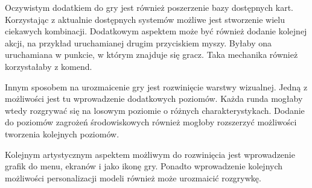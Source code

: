 Oczywistym dodatkiem do gry jest również poszerzenie bazy dostępnych kart. Korzystając z aktualnie dostępnych systemów możliwe jest stworzenie wielu ciekawych kombinacji. Dodatkowym aspektem może być również dodanie kolejnej akcji, na przykład uruchamianej drugim przyciskiem myszy. Byłaby ona uruchamiana w punkcie, w którym znajduje się gracz. Taka mechanika również korzystałaby z komend.

Innym sposobem na urozmaicenie gry jest rozwinięcie warstwy wizualnej. Jedną z możliwości jest tu wprowadzenie dodatkowych poziomów. Każda runda mogłaby wtedy rozgrywać się na losowym poziomie o różnych charakterystykach. Dodanie do poziomów zagrożeń środowiskowych również mogłoby rozszerzyć możliwości tworzenia kolejnych poziomów.

Kolejnym artystycznym aspektem możliwym do rozwinięcia jest wprowadzenie grafik do menu, ekranów i jako ikonę gry. Ponadto wprowadzenie kolejnych możliwości personalizacji modeli również może urozmaicić rozgrywkę.